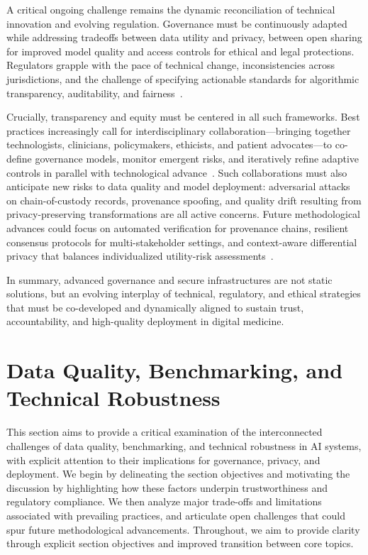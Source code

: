 \documentclass[sigconf]{acmart}
\begin{document}
A critical ongoing challenge remains the dynamic reconciliation of technical innovation and evolving regulation. Governance must be continuously adapted while addressing tradeoffs between data utility and privacy, between open sharing for improved model quality and access controls for ethical and legal protections. Regulators grapple with the pace of technical change, inconsistencies across jurisdictions, and the challenge of specifying actionable standards for algorithmic transparency, auditability, and fairness~\cite{ref91, ref106}.

Crucially, transparency and equity must be centered in all such frameworks. Best practices increasingly call for interdisciplinary collaboration---bringing together technologists, clinicians, policymakers, ethicists, and patient advocates---to co-define governance models, monitor emergent risks, and iteratively refine adaptive controls in parallel with technological advance~\cite{ref91, ref106}. Such collaborations must also anticipate new risks to data quality and model deployment: adversarial attacks on chain-of-custody records, provenance spoofing, and quality drift resulting from privacy-preserving transformations are all active concerns. Future methodological advances could focus on automated verification for provenance chains, resilient consensus protocols for multi-stakeholder settings, and context-aware differential privacy that balances individualized utility-risk assessments~\cite{ref91, ref51}.

In summary, advanced governance and secure infrastructures are not static solutions, but an evolving interplay of technical, regulatory, and ethical strategies that must be co-developed and dynamically aligned to sustain trust, accountability, and high-quality deployment in digital medicine.

\section{Data Quality, Benchmarking, and Technical Robustness}

This section aims to provide a critical examination of the interconnected challenges of data quality, benchmarking, and technical robustness in AI systems, with explicit attention to their implications for governance, privacy, and deployment. We begin by delineating the section objectives and motivating the discussion by highlighting how these factors underpin trustworthiness and regulatory compliance. We then analyze major trade-offs and limitations associated with prevailing practices, and articulate open challenges that could spur future methodological advancements. Throughout, we aim to provide clarity through explicit section objectives and improved transition between core topics.
\end{document}

